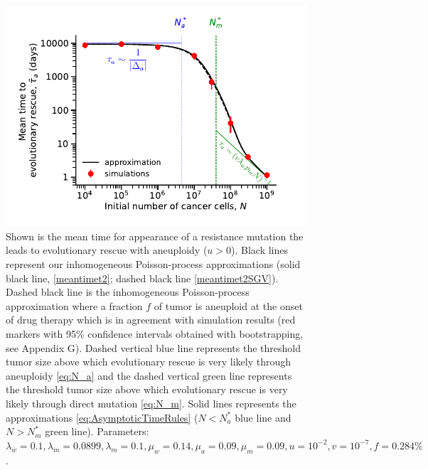 \documentclass[12pt]{extarticle}
\begin{document}
\begin{appendices}
\begin{figure}
\includegraphics[width=1\textwidth]{Figures/SGVEvolutionaryRescueTimeComplete.pdf}
\caption{Shown is the mean time for appearance of a resistance mutation the leads to evolutionary rescue with aneuploidy ($u>0$). Black lines represent our inhomogeneous Poisson-process approximations (solid black line, \cref{meantimet2}; dashed black line \cref{meantimet2SGV}). Dashed black line is the  inhomogeneous Poisson-process approximation where a fraction $f$ of tumor is aneuploid at the onset of drug therapy which is in agreement with simulation results (red markers with 95\% confidence intervals obtained with bootstrapping, see Appendix G). Dashed vertical blue line represents the threshold tumor size above which evolutionary rescue is very likely through aneuploidy \cref{eq:N_a} and the dashed vertical green line represents the threshold tumor size above which evolutionary rescue is very likely through direct mutation \cref{eq:N_m}. Solid lines represents the approximations \cref{eq:AsymptoticTimeRules} ($N<N_a^*$ blue line and $N>N_m^*$ green line). 
Parameters: $\lambda_w=0.1,\lambda_m=0.0899,\lambda_m=0.1,\mu_w=0.14,\mu_a=0.09,\mu_m=0.09, u=10^{-2}, v=10^{-7},f=0.284\%$.}
\label{SGVEvolutionaryRescueTimeComplete}
\end{figure}
\end{appendices}
\end{document}
